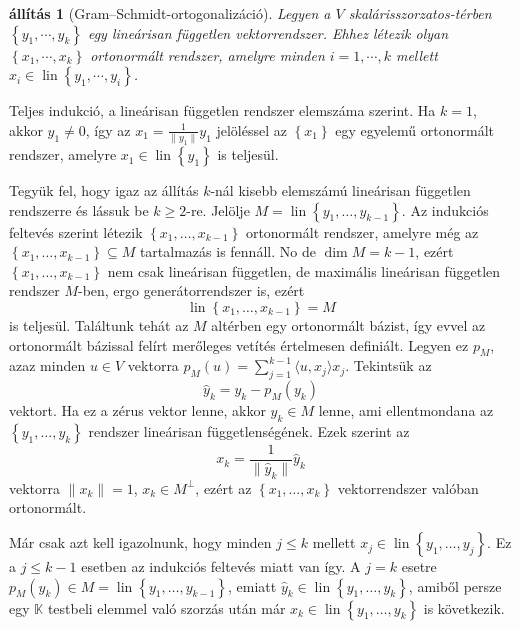 \documentclass[9pt, a4paper, showtrims]{memoir}
\makeatletter
\renewenvironment{proof}[1][\proofname]
    {\par\pushQED{\qed}%
    \normalfont \topsep6\p@\@plus6\p@\relax
    \trivlist
    \item[\hskip\labelsep
        \itshape
    #1\@addpunct{:}]\ignorespaces}
    {\popQED\endtrivlist\@endpefalse}
\theoremstyle{plain}
\newtheorem{proposition}{állítás}[chapter]
\theoremstyle{remark}
\theoremstyle{definition}
\DeclareMathOperator{\lin}{lin}
\newcommand{\ip}[2]{\langle#1,#2\rangle}
\makeatother
\begin{document}
\begin{proposition}[Gram--Schmidt-ortogonalizáció]\label{pr:GS}
    Legyen a $V$ skalárisszorzatos-térben $\left\{ y_1,\cdots,y_k \right\}$ egy lineárisan független
    vektorrendszer. 
    Ehhez létezik olyan $\left\{ x_1,\cdots,x_k \right\}$ ortonormált rendszer, 
    amelyre minden $i=1,\cdots,k$ mellett $x_i\in\lin\left\{ y_1,\cdots,y_i \right\}$.
\end{proposition}
\begin{proof}
    Teljes indukció, a lineárisan független rendszer elemszáma szerint.
    Ha $k=1$, akkor $y_1\neq 0$, így az $x_1=\frac{1}{\|y_1\|}y_1$ jelöléssel az 
    $\left\{ x_1 \right\}$ egy egyelemű ortonormált rendszer, amelyre $x_1\in\lin\left\{ y_1 \right\}$ is teljesül.

    Tegyük fel, hogy igaz az állítás $k$-nál kisebb elemszámú lineárisan független rendszerre és lássuk be $k\geq 2$-re.
    Jelölje $M=\lin\left\{ y_1,\dots,y_{k-1} \right\}$. 
    Az indukciós feltevés szerint létezik $\left\{ x_1,\dots,x_{k-1} \right\}$ ortonormált rendszer,
    amelyre még az
    \begin{math}
        \left\{ x_1,\dots,x_{k-1} \right\}\subseteq M
    \end{math}
    tartalmazás is fennáll.
    No de $\dim M=k-1$, ezért $\left\{ x_1,\dots,x_{k-1} \right\}$ nem csak lineárisan független, 
    de maximális lineárisan független rendszer $M$-ben, ergo generátorrendszer is, ezért
    \[
        \lin\left\{ x_1,\dots,x_{k-1} \right\}=M
    \]
    is teljesül. 
    Találtunk tehát az $M$ altérben egy ortonormált bázist,
    így evvel az ortonormált bázissal felírt merőleges vetítés értelmesen definiált.
    Legyen ez $p_M$, azaz minden $u\in V$ vektorra $p_M\left( u \right)=\sum_{j=1}^{k-1}\ip{u}{x_j}x_j$.
    Tekintsük az 
    \[
        \hat{y}_k=y_k-p_M\left( y_k \right)
    \] 
    vektort. 
    Ha ez a zérus vektor lenne, akkor $y_k\in M$ lenne, ami ellentmondana az $\left\{ y_1,\dots,y_k \right\}$ rendszer
    lineárisan függetlenségének.
    Ezek szerint az 
    \[
        x_k
        =
        \frac{1}{\|\hat{y}_k\|}\hat{y}_k
    \]
    vektorra $\|x_k\|=1$, $x_k\in M^\perp$, ezért az $\left\{ x_1,\dots,x_k \right\}$ vektorrendszer valóban ortonormált.

    Már csak azt kell igazolnunk, hogy minden $j\leq k$ mellett $x_j\in\lin\left\{ y_1,\dots,y_j \right\}$.
    Ez a $j\leq k-1$ esetben az indukciós feltevés miatt van így.
    A $j=k$ esetre $p_M\left( y_k \right)\in M=\lin\left\{ y_1,\dots,y_{k-1} \right\}$,
    emiatt $\hat{y}_k\in\lin\left\{ y_1,\dots,y_k \right\}$, 
    amiből persze egy $\mathbb{K}$ testbeli elemmel való szorzás után már $x_k\in\lin\left\{ y_1,\dots,y_k \right\}$ is következik.
\end{proof}
\end{document}
